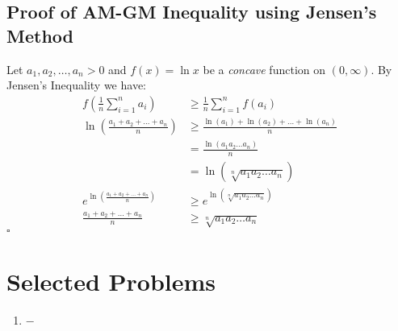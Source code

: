 \documentclass[a4paper,11pt]{article}
\begin{document}
\subsection{Proof of AM-GM Inequality using Jensen's Method}
\begin{tcolorbox}
    Let $a_1, a_2, \dots, a_n > 0$ and $f(x) = \ln{x}$ be a \textit{concave} function on $(0, \infty)$. By Jensen's Inequality we have:
    \begin{align*}
        f \left(\frac{1}{n} \sum_{i=1}^n a_i \right) &\geq \frac{1}{n} \sum_{i=1}^n f(a_i) \\
        \ln{\left( \frac{a_1 + a_2 + \dots + a_n}{n} \right)} &\geq \frac{\ln{(a_1)} + \ln{(a_2)} + \dots + \ln{(a_n)}}{n} \\
        &= \frac{\ln{(a_1 a_2 \dots a_n)}}{n} \\
        &= \ln{(\sqrt[n]{a_1 a_2 \dots a_n})} \\
        e^{\ln{\left( \frac{a_1 + a_2 + \dots + a_n}{n} \right)}} &\geq e^{\ln{(\sqrt[n]{a_1 a_2 \dots a_n})}} \\
        \frac{a_1 + a_2 + \dots + a_n}{n} &\geq \sqrt[n]{a_1 a_2 \dots a_n}
    \end{align*}
    \hfill$\square$
\end{tcolorbox}


\section{Selected Problems}
\begin{enumerate}
    \item $-$
\end{enumerate}
\end{document}
